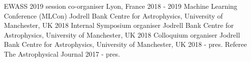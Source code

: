 \begin{cvpress}
   \cvpres
   {EWASS 2019 session co-organiser}
    {Lyon, France}
    {2018 - 2019}
   \cvpres
   {Machine Learning Conference (MLCon)}
    {Jodrell Bank Centre for Astrophysics, University of Manchester, UK}
    {2018}
   \cvpres
   {Internal Symposium organiser}
    {Jodrell Bank Centre for Astrophysics, University of Manchester, UK}
    {2018}
   \cvpres
   {Colloquium organiser}
    {Jodrell Bank Centre for Astrophysics, University of Manchester, UK}
    {2018 - pres.}
    \cvpres
   {Referee}
    {The Astrophysical Journal}
    {2017 - pres.}
\end{cvpress}


